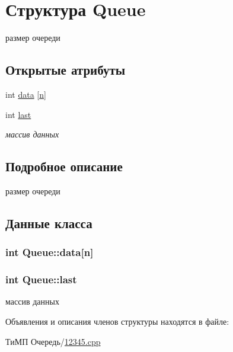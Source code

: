 \hypertarget{struct_queue}{}\section{Структура Queue}
\label{struct_queue}


размер очереди  


\subsection*{Открытые атрибуты}
\begin{DoxyCompactItemize}
\item 
int \hyperlink{struct_queue_a4660b86be84579e0dc1c5338a757dfc5}{data} \mbox{[}\hyperlink{12345_8cpp_acfc02ec89670db29251fda6a66602ce2}{n}\mbox{]}
\item 
int \hyperlink{struct_queue_a254d3713645cad01f2ffee164378d7d8}{last}
\begin{DoxyCompactList}\small\item\em массив данных \end{DoxyCompactList}\end{DoxyCompactItemize}


\subsection{Подробное описание}
размер очереди 

\subsection{Данные класса}
\hypertarget{struct_queue_a4660b86be84579e0dc1c5338a757dfc5}{}
\subsubsection[{data}]{\setlength{\rightskip}{0pt plus 5cm}int Queue\+::data\mbox{[}{\bf n}\mbox{]}}\label{struct_queue_a4660b86be84579e0dc1c5338a757dfc5}
\hypertarget{struct_queue_a254d3713645cad01f2ffee164378d7d8}{}
\subsubsection[{last}]{\setlength{\rightskip}{0pt plus 5cm}int Queue\+::last}\label{struct_queue_a254d3713645cad01f2ffee164378d7d8}


массив данных 



Объявления и описания членов структуры находятся в файле\+:\begin{DoxyCompactItemize}
\item 
ТиМП Очередь/\hyperlink{12345_8cpp}{12345.\+cpp}\end{DoxyCompactItemize}
